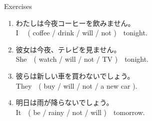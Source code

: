 \documentclass[aspectratio=169,xcolor={dvipsnames,table}]{beamer}
\newcommand{\myaudio}[1]{\href{#1}{\faVolumeUp}}
\begin{document}
\begin{frame}[plain]{Exercises}
 
\begin{enumerate}
 \item わたしは今夜コーヒーを飲みません。\\
 I ~~( coffee / drink / will / not )~~tonight.\\
 \item 彼女は今夜、テレビを見ません。\\
She~~( watch / will / not / TV )~~tonight.\\
 \item 彼らは新しい車を買わないでしょう。\\
 They~~( buy / will / not / a new car ).\\
 \item 明日は雨が降らないでしょう。\\
It~~( be / rainy / not / will )~~tomorrow.\\
\end{enumerate}
\mbox{}\hfill\myaudio{./audio/012_will_05.mp3}
\end{frame}
\end{document}
